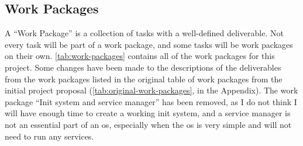 \documentclass{article}
\begin{document}
\subsection{Work Packages}
A ``Work Package'' is a collection of tasks with a well-defined deliverable.
Not every task will be part of a work package, and some tasks will be work
packages on their own. \autoref{tab:work-packages} contains all of the work
packages for this project. Some changes have been made to the descriptions of
the deliverables from the work packages listed in the original table of work
packages from the initial project proposal
(\autoref{tab:original-work-packages}, in the Appendix). The work package
``Init system and service manager'' has been removed, as I do not think I will
have enough time to create a working init system, and a service manager is not
an essential part of an \gls{os}, especially when the \gls{os} is very simple
and will not need to run any services.
\end{document}
